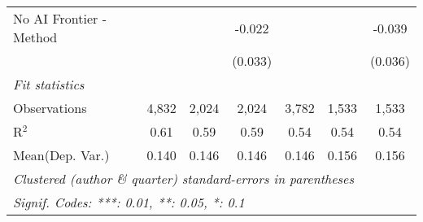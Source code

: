 \begin{tabular}{lcccccc}
   No AI Frontier - Method &               &             & -0.022  &               &              & -0.039\\   
                           &               &             & (0.033) &               &              & (0.036)\\   
   \midrule
   \emph{Fit statistics}\\
   Observations            & 4,832         & 2,024       & 2,024   & 3,782         & 1,533        & 1,533\\  
   R$^2$                   & 0.61          & 0.59        & 0.59    & 0.54          & 0.54         & 0.54\\  
Mean(Dep. Var.) & 0.140 & 0.146 & 0.146 & 0.146 & 0.156 & 0.156 \\
   \midrule \midrule
   \multicolumn{7}{l}{\emph{Clustered (author \& quarter) standard-errors in parentheses}}\\
   \multicolumn{7}{l}{\emph{Signif. Codes: ***: 0.01, **: 0.05, *: 0.1}}\\
\end{tabular}
\par\endgroup
